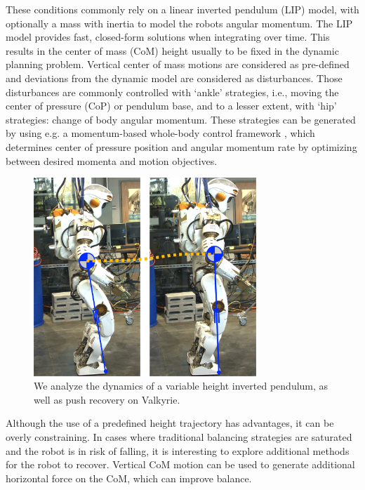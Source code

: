 \documentclass[letterpaper, 10 pt, conference]{ieeeconf}  %
\begin{document}
These conditions commonly rely on a linear inverted pendulum (LIP) model, with optionally a mass with inertia to model the robots angular momentum. The LIP model provides fast, closed-form solutions when integrating over time. This results in the center of mass (CoM) height usually to be fixed in the dynamic planning problem. Vertical center of mass motions are considered as pre-defined and deviations from the dynamic model are considered as disturbances. Those disturbances are commonly controlled with `ankle' strategies, i.e., moving the center of pressure (CoP) or pendulum base, and to a lesser extent, with `hip' strategies: change of body angular momentum. These strategies can be generated by using e.g. a momentum-based whole-body control framework \cite{kajita2003resolved, lee2012momentum,koolen2016design}, which determines center of pressure position and angular momentum rate by optimizing between desired momenta and motion objectives.

\begin{figure}[h]\vspace{0.2cm}
      \centering
      \includegraphics[width=3.3in]{modeltoval.png} %
      \caption{We analyze the dynamics of a variable height inverted pendulum, as well as push recovery on Valkyrie. }
      \label{fig:modeltoval}
\end{figure}

Although the use of a predefined height trajectory has advantages, it can be overly constraining. In cases where traditional balancing strategies are saturated and the robot is in risk of falling, it is interesting to explore additional methods for the robot to recover. Vertical CoM motion can be used to generate additional horizontal force on the CoM, which can improve balance.
\end{document}
